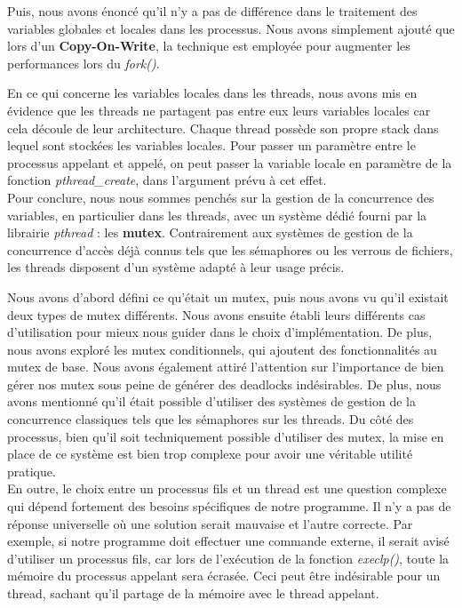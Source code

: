 Puis, nous avons énoncé qu'il n'y a pas de différence dans le traitement des variables globales et locales dans les processus. Nous avons simplement ajouté que lors d'un \textbf{Copy-On-Write}, la technique est employée pour augmenter les performances lors du \textit{fork()}.

En ce qui concerne les variables locales dans les threads, nous avons mis en évidence que les threads ne partagent pas entre eux leurs variables locales car cela découle de leur architecture. Chaque thread possède son propre stack dans lequel sont stockées les variables locales. Pour passer un paramètre entre le processus appelant et appelé, on peut passer la variable locale en paramètre de la fonction \textit{pthread\_create}, dans l'argument prévu à cet effet.
\\

Pour conclure, nous nous sommes penchés sur la gestion de la concurrence des variables, en particulier dans les threads, avec un système dédié fourni par la librairie \textit{pthread} : les \textbf{mutex}. Contrairement aux systèmes de gestion de la concurrence d'accès déjà connus tels que les sémaphores ou les verrous de fichiers, les threads disposent d'un système adapté à leur usage précis.

Nous avons d'abord défini ce qu'était un mutex, puis nous avons vu qu'il existait deux types de mutex différents. Nous avons ensuite établi leurs différents cas d'utilisation pour mieux nous guider dans le choix d'implémentation. De plus, nous avons exploré les mutex conditionnels, qui ajoutent des fonctionnalités au mutex de base. Nous avons également attiré l'attention sur l'importance de bien gérer nos mutex sous peine de générer des deadlocks indésirables. De plus, nous avons mentionné qu'il était possible d'utiliser des systèmes de gestion de la concurrence classiques tels que les sémaphores sur les threads. Du côté des processus, bien qu'il soit techniquement possible d'utiliser des mutex, la mise en place de ce système est bien trop complexe pour avoir une véritable utilité pratique.
\\ 

En outre, le choix entre un processus fils et un thread est une question complexe qui dépend fortement des besoins spécifiques de notre programme. Il n'y a pas de réponse universelle où une solution serait mauvaise et l'autre correcte. Par exemple, si notre programme doit effectuer une commande externe, il serait avisé d'utiliser un processus fils, car lors de l'exécution de la fonction \textit{execlp()}, toute la mémoire du processus appelant sera écrasée. Ceci peut être indésirable pour un thread, sachant qu'il partage de la mémoire avec le thread appelant.

